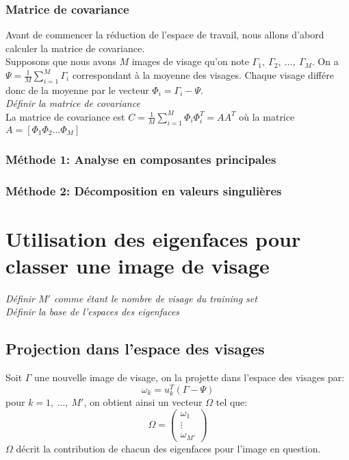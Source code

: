 \documentclass[12pt,french]{article}
\begin{document}
\subsubsection{Matrice de covariance}
Avant de commencer la réduction de l'espace de travail, nous allons d'abord calculer la matrice de covariance.\\
Supposons que nous avons $M$ images de visage qu'on note $\Gamma_1,~\Gamma_2,~\dots,~\Gamma_M$. On a $\Psi = \frac{1}{M}\displaystyle\sum_{i=1}^{M} \Gamma_i$ correspondant à la moyenne des visages.
Chaque visage différe donc de la moyenne par le vecteur $\Phi_i = \Gamma_i - \Psi$.
\\ \emph{Définir la matrice de covariance}\\
La matrice de covariance est $C = \frac{1}{M}\displaystyle\sum_{i=1}^{M} \Phi_i \Phi_i^T=AA^T$ où la matrice $A = [\Phi_1 \Phi_2 \dots \Phi_M]$

\subsubsection{Méthode 1: Analyse en composantes principales}
\subsubsection{Méthode 2: Décomposition en valeurs singulières}
\section{Utilisation des eigenfaces pour classer une image de visage}
\emph{Définir $M'$ comme étant le nombre de visage du training set}\\
\emph{Définir la base de l'espaces des eigenfaces}

\subsection{Projection dans l'espace des visages}
Soit $\Gamma$ une nouvelle image de visage, on la projette dans l'espace des visages par:
$$\omega_k = u_k^T(\Gamma - \Psi)$$
pour $k = 1,~\dots,~M'$, on obtient ainsi un vecteur $\Omega$ tel que:
\[\Omega =
\begin{pmatrix}
  \omega_1 \\
  \vdots \\
  \omega_{M'}
\end{pmatrix}
\]
$\Omega$ décrit la contribution de chacun des eigenfaces pour l'image en question.
\end{document}

